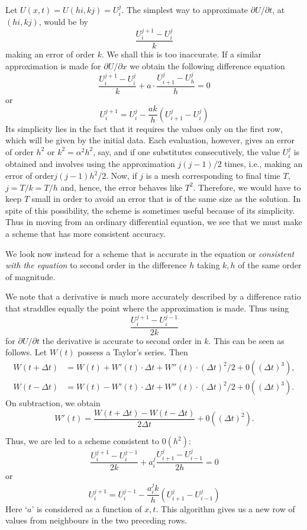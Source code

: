 Let $U(x,t) = U (hi, kj) = U^j_i$.  The simplest way to approximate $\partial U/\partial t$, at $(hi, kj)$, would be by
$$
\frac{U^{j+1}_i - U^j_i}{k}
$$
making an error of order $k$. We shall this is too inaccurate. If a similar approximation is made for $\partial U/\partial x$ we obtain the following difference equation
$$
\frac{U^{j+1}_i - U^j_i}{k} + a \cdot \frac{U^j_{i+1} - U^j_h}{h} = 0
$$
or 
\begin{equation*}
U^{j+1}_i = U^j_i - \frac{ak}{h} (U^j_{i+1} - U^j_i) \tag{1.44}\label{eq1.44}
\end{equation*}
Its simplicity lies in the fact that it requires the values only on the first row, which will be given by the initial data. Each evaluation, however, gives an error of order $h^2$ or $k^2 = \alpha^2 h^2$, say, and if one substitutes consecutively, the value $U^j_i$ is obtained and involves using the approximation $j(j-1)/2$ times, i.e., making an error of order\pageoriginale $j(j-1)h^2/2$. Now, if $j$ is a mesh corresponding to final time $T$, $j = T/k = T/h$ and, hence, the error behaves like $T^2$. Therefore, we would have to keep $T$ small in order to avoid an error that is of the same size as the solution. In spite of this possibility, the scheme is sometimes useful because of its simplicity. Thus in moving from an ordinary differential equation, we see that we must make a scheme that has more consistent accuracy.

We look now instead for a scheme that is accurate in the equation or {\em consistent with the equation} to second order in the difference $h$ taking $k,h$ of the same order of magnitude.

We note that a derivative is much more accurately described by a difference ratio that straddles equally the point where the approximation is made. Thus using
$$
\frac{U^{j+1}_i - U^{j-1}_i}{2k}
$$
for $\partial U / \partial t$ the derivative is accurate to second order in $k$. This can be seen as follows. Let $W(t)$ possess a Taylor's series. Then
\begin{align*}
W(t + \Delta t) & = W(t) + W' (t) \cdot \Delta t+ W'' (t) \cdot (\Delta t)^2 / 2 + 0 ((\Delta t)^3),\\
W (t- \Delta t) & = W(t) - W' (t) \cdot \Delta t + W'' (t) \cdot (\Delta t)^2 / 2 + 0 ((\Delta t)^3). 
\end{align*}
On subtraction, we obtain
$$
W'(t) = \frac{W(t+ \Delta t) - W(t- \Delta t)}{2\Delta t} + 0 ((\Delta t)^2). 
$$

Thus, we are led to a scheme consistent to $0(h^2)$:
$$
\frac{U^{j+1}_i - U^{j-1}_i}{2k} + a^j_i \frac{U^{j}_{i+1} - U^j_{i-1}}{2h} =0
$$\pageoriginale
or
\begin{equation*}
U^{j+1}_i = U^{j-1}_i - \frac{a^j_i k}{h} (U^j_{i+1} - U^j_{i-1})  
\tag{1.45}\label{eq1.45}
\end{equation*}
Here `$a$' is considered as a function of $x,t$. This algorithm gives us a new row of values from neighbours in the two preceding rows. 

